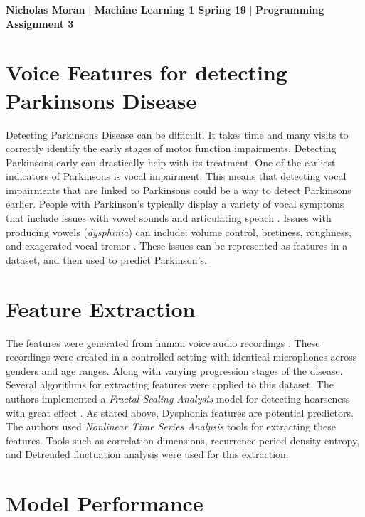 \setlength{\parindent}{10ex}

\textbf{Nicholas Moran} |
\textbf{Machine Learning 1 Spring 19} |
\textbf{Programming Assignment 3} 

\section{Voice Features for detecting Parkinsons Disease}
    Detecting Parkinsons Disease can be difficult. 
    It takes time and many visits to correctly identify the early stages of motor function impairments.
    Detecting Parkinsons early can drastically help with its treatment.
    One of the earliest indicators of Parkinsons is vocal impairment.
    This means that detecting vocal impairments that are linked to Parkinsons could be a way to detect Parkinsons  earlier.
    People with Parkinson's typically display a variety of vocal symptoms that include issues with vowel sounds and articulating speach \cite{little}.
    Issues with producing vowels (\textit{dysphinia}) can include: volume control, bretiness, roughness, and exagerated vocal tremor \cite{little}.
    These issues can be represented as features in a dataset, and then used to predict Parkinson's.


\section{Feature Extraction}
    The features were generated from human voice audio recordings \cite{little}.
    These recordings were created in a controlled setting with identical microphones across genders and age ranges.
    Along with varying progression stages of the disease. 
    Several algorithms for extracting features were applied to this dataset.
    The authors implemented a \textit{Fractal Scaling Analysis} model for detecting hoarseness with great effect \cite{McSharry}.
    As stated above, Dysphonia features are potential predictors. 
    The authors used \textit{Nonlinear Time Series Analysis} tools for extracting these features.
    Tools such as correlation dimensions, recurrence period density entropy, and Detrended fluctuation analysis were used for this extraction.





\section{Model Performance}

